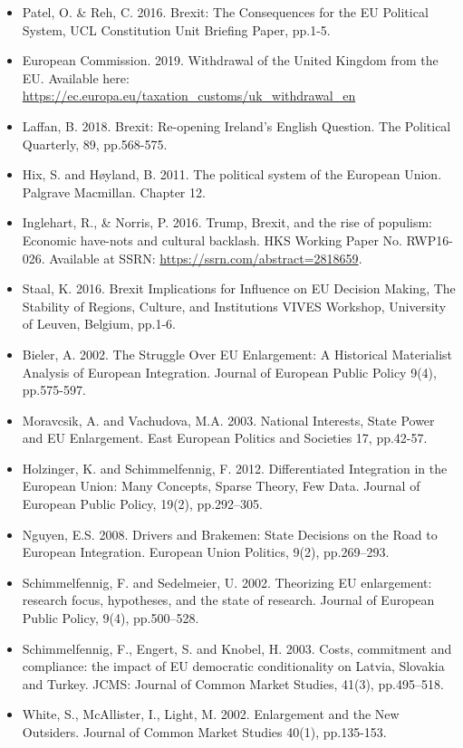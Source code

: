 \begin{itemize}
	\item Patel, O. \& Reh, C. 2016. Brexit: The Consequences for the EU Political System, UCL Constitution Unit Briefing Paper, pp.1-5. 
	\item European Commission. 2019. Withdrawal of the United Kingdom from the EU. Available here: \url{https://ec.europa.eu/taxation_customs/uk_withdrawal_en}
	\item Laffan, B. 2018. Brexit: Re-opening Ireland's English Question. The Political Quarterly, 89, pp.568-575. 
	\item Hix, S. and H\o yland, B. 2011. The political system of the European Union. Palgrave Macmillan. Chapter 12.
	\item Inglehart, R., \& Norris, P. 2016. Trump, Brexit, and the rise of populism: Economic have-nots and cultural backlash. HKS Working Paper No. RWP16-026. Available at SSRN: \url{https://ssrn.com/abstract=2818659}.
	\item Staal, K. 2016. Brexit Implications for Influence on EU Decision Making, The Stability of Regions, Culture, and Institutions VIVES Workshop, University of Leuven, Belgium, pp.1-6.
	\item Bieler, A. 2002. The Struggle Over EU Enlargement: A Historical Materialist Analysis of European Integration. Journal of European Public Policy 9(4), pp.575-597.
	\item Moravcsik, A. and Vachudova, M.A. 2003. National Interests, State Power and EU Enlargement. East European Politics and Societies 17, pp.42-57.
	\item Holzinger, K. and Schimmelfennig, F. 2012. Differentiated Integration in the European Union: Many Concepts, Sparse Theory, Few Data. Journal of European Public Policy, 19(2), pp.292–305.
	\item Nguyen, E.S. 2008. Drivers and Brakemen: State Decisions on the Road to European Integration. European Union Politics, 9(2), pp.269–293.
	\item Schimmelfennig, F. and Sedelmeier, U. 2002. Theorizing EU enlargement: research focus, hypotheses, and the state of research. Journal of European Public Policy, 9(4), pp.500–528.
	\item Schimmelfennig, F., Engert, S. and Knobel, H. 2003. Costs, commitment and compliance: the impact of EU democratic conditionality on Latvia, Slovakia and Turkey. JCMS: Journal of Common Market Studies, 41(3), pp.495–518.
	\item White, S., McAllister, I., Light, M. 2002. Enlargement and the New Outsiders. Journal of Common Market Studies 40(1), pp.135-153. 

\end{itemize}
